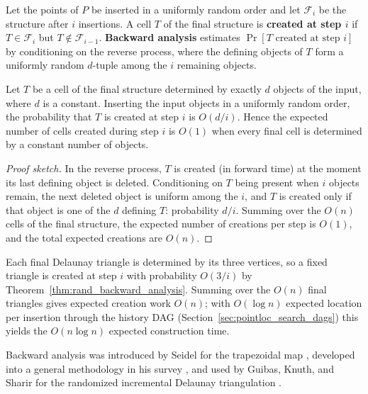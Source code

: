 \begin{definition}\label{def:rand_backward_analysis}
  Let the points of $P$ be inserted in a uniformly random order and let
  $\mathcal{F}_i$ be the structure after $i$ insertions. A cell $T$ of the
  final structure is \textbf{created at step $i$} if $T \in \mathcal{F}_i$ but
  $T \notin \mathcal{F}_{i-1}$. \textbf{Backward analysis} estimates
  $\Pr[T \text{ created at step } i]$ by conditioning on the reverse process,
  where the defining objects of $T$ form a uniformly random $d$-tuple among the
  $i$ remaining objects.
\end{definition}

\begin{theorem}\label{thm:rand_backward_analysis}
  Let $T$ be a cell of the final structure determined by exactly $d$ objects of
  the input, where $d$ is a constant. Inserting the input objects in a
  uniformly random order, the probability that $T$ is created at step $i$ is
  $O(d/i)$. Hence the expected number of cells created during step $i$ is
  $O(1)$ when every final cell is determined by a constant number of objects.
\end{theorem}

\begin{proof}[Proof sketch]
  In the reverse process, $T$ is created (in forward time) at the moment its
  last defining object is deleted. Conditioning on $T$ being present when $i$
  objects remain, the next deleted object is uniform among the $i$, and $T$ is
  created only if that object is one of the $d$ defining $T$: probability $d/i$.
  Summing over the $O(n)$ cells of the final structure, the expected number of
  creations per step is $O(1)$, and the total expected creations are $O(n)$.
\end{proof}

\begin{example}\label{ex:rand_backward_delaunay}
  Each final Delaunay triangle is determined by its three vertices, so a fixed
  triangle is created at step $i$ with probability $O(3/i)$ by
  Theorem~\ref{thm:rand_backward_analysis}. Summing over the $O(n)$ final
  triangles gives expected creation work $O(n)$; with $O(\log n)$ expected
  location per insertion through the history DAG
  (Section~\ref{sec:pointloc_search_dags}) this yields the $O(n \log n)$
  expected construction time.
\end{example}

Backward analysis was introduced by Seidel for the trapezoidal map
\cite{seidel1991}, developed into a general methodology in his survey
\cite{seidel1993}, and used by Guibas, Knuth, and Sharir for the randomized
incremental Delaunay triangulation \cite{guibas1992}.

